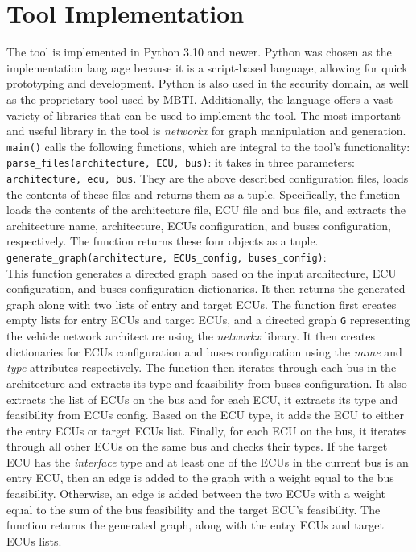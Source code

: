 \section{Tool Implementation}
\label{sec:implementation}

The tool is implemented in Python 3.10 and newer.
Python was chosen as the implementation language because it is a script-based language, allowing for quick prototyping and development.
Python is also used in the security domain, as well as the proprietary tool used by MBTI.
Additionally, the language offers a vast variety of libraries that can be used to implement the tool.
The most important and useful library in the tool is \textit{networkx} for graph manipulation and generation.\\

\texttt{main()} calls the following functions, which are integral to the tool's functionality:\\

\texttt{parse\_files(architecture, ECU, bus)}: it takes in three parameters: \texttt{architecture, ecu, bus}.
They are the above described configuration files, loads the contents of these files and returns them as a tuple. 
Specifically, the function loads the contents of the architecture file, ECU file and bus file, 
and extracts the architecture name, architecture, ECUs configuration, and buses configuration, respectively. 
The function returns these four objects as a tuple.\\

\texttt{generate\_graph(architecture, ECUs\_config, buses\_config)}:\\
This function generates a directed graph based on the input architecture, ECU configuration, and buses configuration dictionaries. 
It then returns the generated graph along with two lists of entry and target ECUs.
The function first creates empty lists for entry ECUs and target ECUs, and a directed graph \texttt{G} representing the vehicle network architecture using the \textit{networkx} library. 
It then creates dictionaries for ECUs configuration and buses configuration using the \textit{name} and \textit{type} attributes respectively.
The function then iterates through each bus in the architecture and extracts its type and feasibility from buses configuration. 
It also extracts the list of ECUs on the bus and for each ECU, it extracts its type and feasibility from ECUs config. 
Based on the ECU type, it adds the ECU to either the entry ECUs or target ECUs list.
Finally, for each ECU on the bus, it iterates through all other ECUs on the same bus and checks their types. 
If the target ECU has the \textit{interface} type and at least one of the ECUs in the current bus is an entry ECU, 
then an edge is added to the graph with a weight equal to the bus feasibility. 
Otherwise, an edge is added between the two ECUs with a weight equal to the sum of the bus feasibility and the target ECU's feasibility.
The function returns the generated graph, along with the entry ECUs and target ECUs lists.\\

